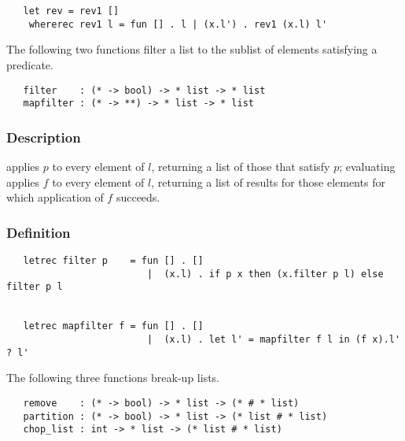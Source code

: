 \begin{hol}\begin{verbatim}
   let rev = rev1 []
    whererec rev1 l = fun [] . l | (x.l') . rev1 (x.l) l'
\end{verbatim}\end{hol}


\noindent The following two functions filter a list to the sublist of elements
satisfying a predicate.

\begin{boxed}
\begin{verbatim}
   filter    : (* -> bool) -> * list -> * list
   mapfilter : (* -> **) -> * list -> * list
\end{verbatim}\end{boxed}

\subsubsection*{Description}

 applies $p$ to every element of $l$, returning a list of
those that satisfy $p$; evaluating
 applies $f$ to every element of $l$, returning
a list of results for those elements for which application of $f$ succeeds.

\subsubsection*{Definition}

\begin{hol}\begin{verbatim}
   letrec filter p    = fun [] . []
                         |  (x.l) . if p x then (x.filter p l) else filter p l


   letrec mapfilter f = fun [] . []
                         |  (x.l) . let l' = mapfilter f l in (f x).l' ? l'
\end{verbatim}\end{hol}


\noindent The following three functions break-up lists.

\begin{boxed}
\begin{verbatim}
   remove    : (* -> bool) -> * list -> (* # * list)
   partition : (* -> bool) -> * list -> (* list # * list)
   chop_list : int -> * list -> (* list # * list)
\end{verbatim}\end{boxed}

